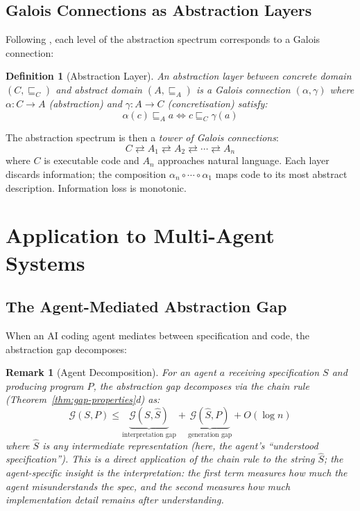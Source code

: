 \documentclass[11pt, a4paper, copyright]{googledeepmind}
\newtheorem{definition}{Definition}[section]
\newtheorem*{remark}{Remark}
\begin{document}
\subsection{Galois Connections as Abstraction Layers}

Following \citet{cousot1977abstract}, each level of the abstraction spectrum corresponds to a Galois connection:

\begin{definition}[Abstraction Layer]
An \emph{abstraction layer} between concrete domain $(C, \sqsubseteq_C)$ and abstract domain $(A, \sqsubseteq_A)$ is a Galois connection $(\alpha, \gamma)$ where $\alpha: C \to A$ (abstraction) and $\gamma: A \to C$ (concretisation) satisfy:
\begin{equation}
    \alpha(c) \sqsubseteq_A a \iff c \sqsubseteq_C \gamma(a)
\end{equation}
\end{definition}

The abstraction spectrum is then a \emph{tower of Galois connections}:
\begin{equation}
    C \rightleftarrows A_1 \rightleftarrows A_2 \rightleftarrows \cdots \rightleftarrows A_n
\end{equation}
where $C$ is executable code and $A_n$ approaches natural language. Each layer discards information; the composition $\alpha_n \circ \cdots \circ \alpha_1$ maps code to its most abstract description. Information loss is monotonic.


\section{Application to Multi-Agent Systems}
\label{sec:multi-agent}

\subsection{The Agent-Mediated Abstraction Gap}

When an AI coding agent mediates between specification and code, the abstraction gap decomposes:

\begin{remark}[Agent Decomposition]
\label{prop:agent-decomp}
For an agent $a$ receiving specification $S$ and producing program $P$, the abstraction gap decomposes via the chain rule (Theorem~\ref{thm:gap-properties}d) as:
\begin{equation}
    \mathcal{G}(S, P) \leq \underbrace{\mathcal{G}(S, \hat{S})}_{\text{interpretation gap}} + \underbrace{\mathcal{G}(\hat{S}, P)}_{\text{generation gap}} + O(\log n)
\end{equation}
where $\hat{S}$ is any intermediate representation (here, the agent's ``understood specification''). This is a direct application of the chain rule to the string $\hat{S}$; the agent-specific insight is the \emph{interpretation}: the first term measures how much the agent misunderstands the spec, and the second measures how much implementation detail remains after understanding.
\end{remark}
\end{document}
